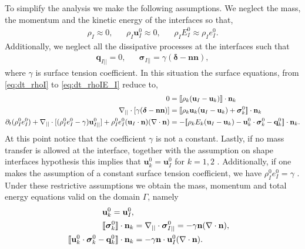 To simplify the analysis we make the following assumptions. We neglect the mass, the momentum and the kinetic energy of the interfaces so that,
\begin{align*}
    \rho_I \approx 0,
    &&
    \rho_I \textbf{u}_I^0 \approx 0,
    &&
    \rho_I E_I^0 \approx \rho_I e_I^0. 
\end{align*}
Additionally, we neglect all the dissipative processes at the interfaces such that
\begin{align*}
    \textbf{q}_{I||} = 0,
    &&
    \bm\sigma_{I||} = \gamma (\bm\delta  - \textbf{nn}),
\end{align*}
where $\gamma$ is surface tension coefficient. 
In this situation the surface equations, from \ref{eq:dt_rhoI} to \ref{eq:dt_rhoIE_I} reduce to, 
\begin{align}
    0&= 
    \llbracket 
        \rho_k (\textbf{u}_I - \textbf{u}_k)
     \rrbracket \cdot \textbf{n}_k
    \\
    \mathbf{\nabla}_{||}\cdot [\gamma ( \bm\delta - \textbf{nn})]
    &= 
    \llbracket 
        \rho_k \textbf{u}_k (\textbf{u}_I - \textbf{u}_k)
        + \bm\sigma^0_k
     \rrbracket \cdot \textbf{n}_k
    \\
    \partial_t (\rho_I^0e_I^0)  
    + \mathbf{\nabla}_{||}\cdot [
        (\rho_I^0 e_I^0 - \gamma)
         \textbf{u}_{I||}^0
        ]
    + \rho_I^0e_I^0  (\textbf{u}_I \cdot \textbf{n})(\mathbf{\nabla}\cdot \textbf{n})
    &= 
    -\llbracket 
        \rho_k E_k (\textbf{u}_I - \textbf{u}_k)
        - \textbf{u}_k^0 \cdot \bm{\sigma}_k^0 - \textbf{q}_k^0
     \rrbracket \cdot \textbf{n}_k. 
\end{align} 
At this point notice that the coefficient $\gamma$ is not a constant. 
Lastly, if no mass transfer is allowed at the interface, together with the assumption on shape interfaces hypothesis this implies that $\textbf{u}_k^0 = \textbf{u}_I^0$ for $k = 1,2$ \citep[chapter 2]{tryggvason2011direct}. 
Additionally, if one makes the assumption of a constant surface tension coefficient, we have $\rho_I^0 e_I^0 = \gamma$ \citep{ishii2010thermo}.  
Under these restrictive assumptions we obtain the mass, momentum and total energy equations valid on the domain $\Gamma$, namely
\begin{align}
    \label{eq:dt_rho_I}
    \textbf{u}_k^0 = \textbf{u}_I^0, \\
    \llbracket \bm{\sigma}_k^0 \rrbracket \cdot \textbf{n}_k 
    &=
    \mathbf{\nabla}_{||}\cdot\bm\sigma^0_{I||}
    =
    -\gamma\textbf{n}(\mathbf{\nabla}\cdot \textbf{n}),
    \label{eq:surface_tension}\\
    \label{eq:dt_rhoI_EI}
    \llbracket \textbf{u}_k^0 \cdot \bm{\sigma}_k^0 - \textbf{q}_k^0 \rrbracket \cdot \textbf{n}_k
    &=
    -\gamma\textbf{n}\cdot \textbf{u}_{I}^0(\mathbf{\nabla}\cdot \textbf{n}).
\end{align}
